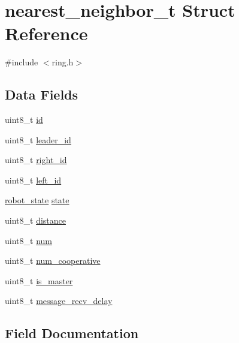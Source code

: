 \hypertarget{structnearest__neighbor__t}{}\section{nearest\+\_\+neighbor\+\_\+t Struct Reference}
\label{structnearest__neighbor__t}


{\ttfamily \#include $<$ring.\+h$>$}

\subsection*{Data Fields}
\begin{DoxyCompactItemize}
\item 
uint8\+\_\+t \hyperlink{structnearest__neighbor__t_a5066463b41970a48266d868b25c9c211}{id}
\item 
uint8\+\_\+t \hyperlink{structnearest__neighbor__t_a27f4c3bf9c4eaf647de330c4855c0559}{leader\+\_\+id}
\item 
uint8\+\_\+t \hyperlink{structnearest__neighbor__t_af02c019de642bf55bdf9a4126fbcf834}{right\+\_\+id}
\item 
uint8\+\_\+t \hyperlink{structnearest__neighbor__t_a984e7811a540a37d34dafd2644e0dc88}{left\+\_\+id}
\item 
\hyperlink{ring_8h_a69b20b1a04c8e4cf3b72851b966259ec}{robot\+\_\+state} \hyperlink{structnearest__neighbor__t_a6888323805aed698b5485548a6b17390}{state}
\item 
uint8\+\_\+t \hyperlink{structnearest__neighbor__t_ae89e1b1120b55df59443ab6f743d95d9}{distance}
\item 
uint8\+\_\+t \hyperlink{structnearest__neighbor__t_a2281e5dac12c7cd3c84d4902077d84c9}{num}
\item 
uint8\+\_\+t \hyperlink{structnearest__neighbor__t_a1067d90cd055d66e9657dfa1dfe76202}{num\+\_\+cooperative}
\item 
uint8\+\_\+t \hyperlink{structnearest__neighbor__t_a8fb8cdaaad4b8319b893fb380c3f0947}{is\+\_\+master}
\item 
uint8\+\_\+t \hyperlink{structnearest__neighbor__t_af8fb01d88cd77eb5d08de8d1834b03d3}{message\+\_\+recv\+\_\+delay}
\end{DoxyCompactItemize}


\subsection{Field Documentation}
\mbox{\label{structnearest__neighbor__t_ae89e1b1120b55df59443ab6f743d95d9}} 
